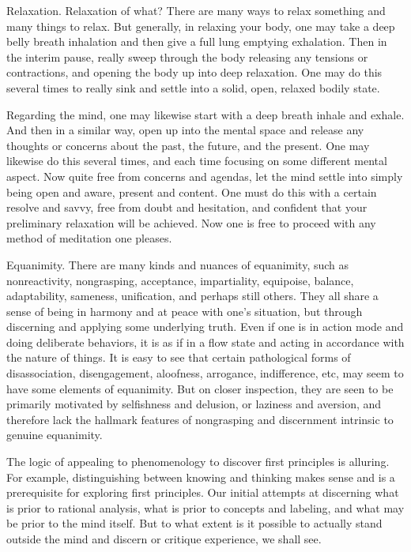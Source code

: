 \documentclass[12pt,openany]{book}
\begin{document}
Relaxation. Relaxation of what? There are many ways to relax something and many things to relax. But generally, in relaxing your body, one may take a deep belly breath inhalation and then give a full lung emptying exhalation. Then in the interim pause, really sweep through the body releasing any tensions or contractions, and opening the body up into deep relaxation. One may do this several times to really sink and settle into a solid, open, relaxed bodily state. 

Regarding the mind, one may likewise start with a deep breath inhale and exhale. And then in a similar way, open up into the mental space and release any thoughts or concerns about the past, the future, and the present. One may likewise do this several times, and each time focusing on some different mental aspect. Now quite free from concerns and agendas, let the mind settle into simply being open and aware, present and content. One must do this with a certain resolve and savvy, free from doubt and hesitation, and confident that your preliminary relaxation will be \linebreak achieved. Now one is free to proceed with any method of meditation one pleases.  

Equanimity. There are many kinds and nuances of equanimity, such as nonreactivity, nongrasping, acceptance, impartiality, equipoise, balance, adaptability, sameness, unification, and perhaps still others. They all share a sense of being in harmony and at peace with one’s situation, but through discerning and applying some underlying truth. Even if one is in action mode and doing deliberate behaviors, it is as if in a flow state and acting in accordance with the nature of things. It is easy to see that certain pathological forms of disassociation, disengagement, aloofness, arrogance, indifference, etc, may seem to have some elements of equanimity. But on closer inspection, they are seen to be primarily motivated by selfishness and delusion, or laziness and aversion, and therefore lack the hallmark features of nongrasping and discernment intrinsic to genuine equanimity.

The logic of appealing to phenomenology to discover first principles is alluring. For example, distinguishing between knowing and thinking makes sense and is a prerequisite for exploring first principles. Our initial attempts at discerning what is prior to rational analysis, what is prior to concepts and labeling, and what may be prior to the mind itself. But to what extent is it possible to actually stand outside the mind and discern or critique experience, we shall see.
 
\end{document}
